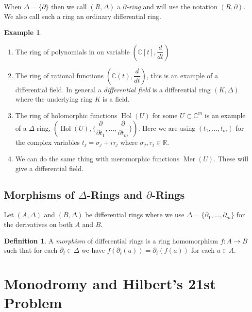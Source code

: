 \documentclass[]{book}
\numberwithin{equation}{section}
\theoremstyle{definition}
\newtheorem{definition}[theorem]{Definition}
\newtheorem{example}[theorem]{Example}
\theoremstyle{remark}
\newcommand{\RR}{\mathbb{R}}
\newcommand{\CC}{\mathbb{C}}
\newcommand{\hol}{\operatorname{Hol}}
\newcommand{\Mer}{\operatorname{Mer}}
\begin{document}
When $\Delta = \lbrace \partial \rbrace$ then we call $(R,\Delta)$ a \emph{$\partial$-ring} and will use the notation $(R,\partial)$. 
We also call such a ring an ordinary differential ring. 


\begin{example}
	\begin{enumerate}
		\item The ring of polynomials in on variable $(\CC[t],\dfrac{d}{dt})$ 
		\item The ring of rational functions $(\CC(t), \dfrac{d}{dt})$, this is an example of a differential field. 
		In general a \emph{differential field} is a differential ring $(K,\Delta)$ where the underlying ring $K$ is a field. 
		\item The ring of holomorphic functions $\hol(U)$ for some $U\subset \CC^m$ is an example of a $\Delta$-ring, $(\hol(U), \lbrace \dfrac{\partial}{\partial t_1}, \ldots, \dfrac{\partial}{\partial t_m}\rbrace )$. 
		Here we are using $(t_1,\ldots,t_m)$ for the complex variables $t_j = \sigma_j + i \tau_j$ where $\sigma_j,\tau_j \in \RR$. 
		\item We can do the same thing with meromorphic functions $\Mer(U)$. These will give a differential field. 
	\end{enumerate}
\end{example}

\section{Morphisms of $\Delta$-Rings and $\partial$-Rings}
Let $(A,\Delta)$ and $(B,\Delta)$ be differential rings where we use $\Delta = \lbrace \partial_1,\ldots,\partial_m\rbrace$ for the derivatives on both $A$ and $B$.
\begin{definition}
A \emph{morphism} of differential rings is a ring homomorphism $f:A\to B$ such that for each $\partial_i \in \Delta$ we have $f(\partial_i(a)) = \partial_i(f(a))$ for each $a\in A$. 
\end{definition}

\chapter{Monodromy and Hilbert's 21st Problem }
\end{document}
